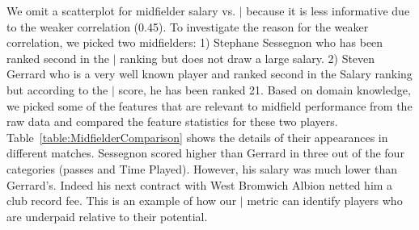 {We omit a scatterplot for midfielder salary vs. $\mid$ because it is less informative due to the weaker  correlation (0.45).
%
To investigate the reason for the weaker correlation, we picked two midfielders: 1) Stephane Sessegnon  who has been ranked second in the $\mid$ ranking but does not draw a large salary. 2) Steven Gerrard who is a very well known player and ranked second in the Salary ranking but according to the $\mid$ score, he has been ranked 21. Based on domain knowledge, we picked some of the features that are relevant to midfield performance from the raw data and compared the feature statistics for these two players. Table~\ref{table:MidfielderComparison} shows the details of their appearances in different matches. Sessegnon scored higher than Gerrard in three out of the four categories (passes and Time Played). However, his salary was much lower than Gerrard's. Indeed his next contract with West Bromwich Albion netted him a club record fee. This is an example of how our $\mid$ metric can identify players who are underpaid relative to their potential.
		\begin{table}[htbp]
			
			\centering
\end{table}}
